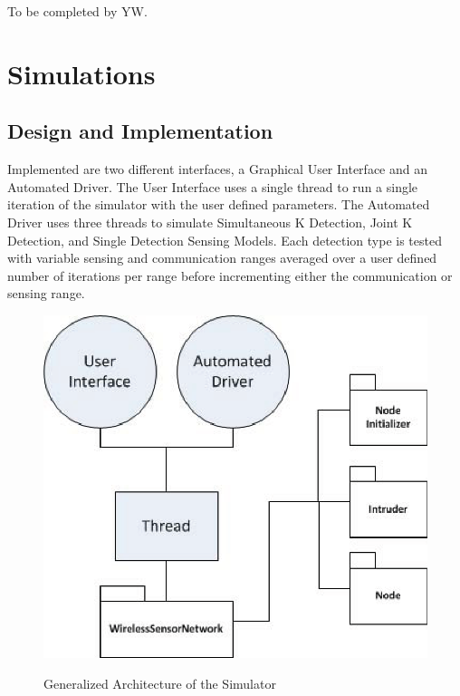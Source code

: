 \documentclass[10pt, conference, compsocconf, twocolumn]{IEEEtran}
\begin{document}
To be completed by YW.



\section{Simulations}

\subsection{Design and Implementation}

%




Implemented are two different interfaces, a Graphical User Interface
and an Automated Driver.  The User Interface uses a single thread to
run a single iteration of the simulator with the user defined parameters.
The Automated Driver uses three threads to simulate Simultaneous K Detection,
Joint K Detection, and Single Detection Sensing Models.  Each detection type is
 tested with variable sensing and communication ranges averaged over a user defined number of
 iterations per range before incrementing either the communication or sensing range.

\begin{figure} [h]
  \includegraphics[width=3.2 in]{BasicArchitecture.eps}\\
  \caption{Generalized Architecture of the Simulator}\label{BasicArchitecture.eps}
\end{figure}
\end{document}
